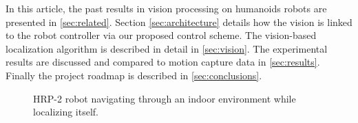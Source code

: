 In this article, the past results in vision processing on humanoids
robots are presented in \ref{sec:related}. Section
\ref{sec:architecture} details how the vision is linked to the robot
controller via our proposed control scheme. The vision-based
localization algorithm is described in detail in \ref{sec:vision}. The
experimental results are discussed and compared to motion capture data
in \ref{sec:results}. Finally the project roadmap is described in
\ref{sec:conclusions}.

\begin{figure}[ht]
  \begin{center}
  \end{center}
  \caption{HRP-2 robot navigating through an indoor environment while
    localizing itself.\label{fig:xp_final}}
\end{figure}

